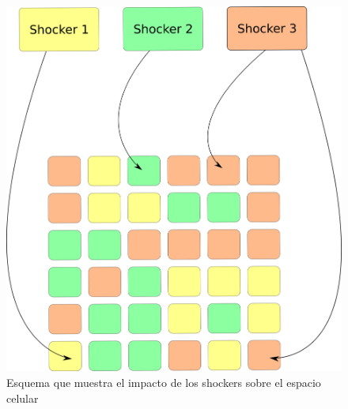 \begin{figure}[!h]
\centering
\includegraphics[scale=0.5]{imagenes/agentes_celdas_modelo.png}
\caption{Esquema que muestra el impacto de los shockers sobre el espacio celular}
\label{fig:modelo_shockers}
\end{figure}
